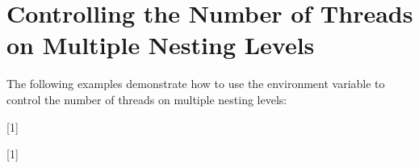 \section{Controlling the Number of Threads on Multiple Nesting Levels}
\label{sec:nthrs_nesting}

The following examples demonstrate how to use the  environment 
variable  to control the number of threads on multiple nesting levels:

[1]

[1]


